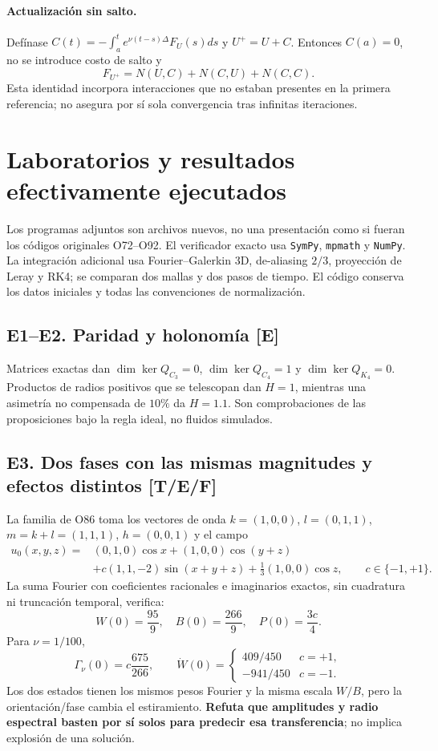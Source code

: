 \documentclass[11pt,a4paper]{article}
\theoremstyle{definition}\newtheorem{defi}[teo]{Definición}
\newcommand{\stat}[1]{\textcolor{blue!50!black}{\textsf{[#1]}}}
\begin{document}
\paragraph{Actualización sin salto.} Defínase $C(t)=-\int_a^t e^{\nu(t-s)\Delta}F_U(s)ds$ y $U^+=U+C$. Entonces $C(a)=0$, no se introduce costo de salto y
\[
F_{U^+}=N(U,C)+N(C,U)+N(C,C).
\]
Esta identidad incorpora interacciones que no estaban presentes en la primera referencia; no asegura por sí sola convergencia tras infinitas iteraciones.

\section{Laboratorios y resultados efectivamente ejecutados}
Los programas adjuntos son archivos nuevos, no una presentación como si fueran los códigos originales O72--O92. El verificador exacto usa \texttt{SymPy}, \texttt{mpmath} y \texttt{NumPy}. La integración adicional usa Fourier--Galerkin 3D, de-aliasing $2/3$, proyección de Leray y RK4; se comparan dos mallas y dos pasos de tiempo. El código conserva los datos iniciales y todas las convenciones de normalización.

\subsection*{E1--E2. Paridad y holonomía \stat{E}}
Matrices exactas dan $\dim\ker Q_{C_3}=0$, $\dim\ker Q_{C_4}=1$ y $\dim\ker Q_{K_4}=0$. Productos de radios positivos que se telescopan dan $H=1$, mientras una asimetría no compensada de $10\%$ da $H=1.1$. Son comprobaciones de las proposiciones bajo la regla ideal, no fluidos simulados.

\subsection*{E3. Dos fases con las mismas magnitudes y efectos distintos \stat{T/E/F}}
La familia de O86 toma los vectores de onda $k=(1,0,0)$, $l=(0,1,1)$, $m=k+l=(1,1,1)$, $h=(0,0,1)$ y el campo
\begin{align}
u_0(x,y,z)={}&(0,1,0)\cos x+(1,0,0)\cos(y+z)\\
&+c(1,1,-2)\sin(x+y+z)+\tfrac13(1,0,0)\cos z,
\qquad c\in\{-1,+1\}.
\end{align}
La suma Fourier con coeficientes racionales e imaginarios exactos, sin cuadratura ni truncación temporal, verifica:
\begin{equation}\label{eq:phaseresult}
\boxed{W(0)=\frac{95}{9},\quad B(0)=\frac{266}{9},\quad P(0)=\frac{3c}{4}.}
\end{equation}
Para $\nu=1/100$,
\begin{equation}
\Gamma_\nu(0)=c\frac{675}{266},\qquad
\dot W(0)=\begin{cases}409/450& c=+1,\\ -941/450&c=-1.\end{cases}
\end{equation}
Los dos estados tienen los mismos pesos Fourier y la misma escala $W/B$, pero la orientación/fase cambia el estiramiento. \textbf{Refuta que amplitudes y radio espectral basten por sí solos para predecir esa transferencia}; no implica explosión de una solución.
\end{document}
